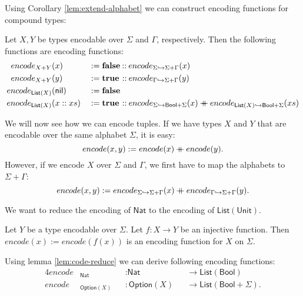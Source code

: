 \documentclass{psartcl}
\newcommand{\MS}[1]{\textsf{#1}}
\newcommand{\nil}{\MS{nil}}
\newcommand{\cons}{\mathbin{::}}
\newcommand\mdoubleplus{\ensuremath{\mathbin{+\mkern-10mu+}}}
\newcommand{\app}{\mdoubleplus}
\newcommand{\from}{:}
\renewcommand{\to}{\rightarrow}
\newcommand{\Option}{\MS{Option}}
\newcommand{\Bool}{\MS{Bool}}
\newcommand{\Nat}{\MS{Nat}}
\newcommand{\Unit}{\MS{Unit}}
\newcommand{\List}{\MS{List}}
\newcommand{\true}{\mathbf{true}}
\newcommand{\false}{\mathbf{false}}
\newcommand{\Tau}{\Gamma}
\begin{document}
Using Corollary \ref{lem:extend-alphabet} we can construct encoding functions for compound types:
\begin{corollary}
  \label{lem:code-compound}
  Let $X, Y$ be types encodable over $\Sigma$ and $\Tau$, respectively.
  Then the following functions are encoding functions:
  \begin{alignat*}{2}
    encode_{X+Y}&(x)             &&:= \false                 \cons encode_{\Sigma \hookrightarrow \Sigma + \Tau}(x) \\
    encode_{X+Y}&(y)             &&:= \true \hspace{0.15em} \cons encode_{\Tau   \hookrightarrow \Sigma + \Tau}(y) \\
    encode_{\List(X)}& (\nil)    &&:= \false \\
    enocde_{\List(X)}& (x :: xs) &&:= \true \hspace{0.15em} \cons encode_{\Sigma \hookrightarrow \Bool + \Sigma}(x) \app
                                      encode_{\List(X) \hookrightarrow \Bool + \Sigma}(xs)
  \end{alignat*}
\end{corollary}

We will now see how we can encode tuples.  If we have types $X$ and $Y$ that are encodable over the same alphabet $\Sigma$, it is easy:
$$encode(x,y) := encode(x) \app encode(y).$$
However, if we encode $X$ over $\Sigma$ and $\Tau$, we first have to map the alphabets to $\Sigma + \Tau$:
$$encode(x,y) := encode_{\Sigma \hookrightarrow \Sigma + \Tau}(x) \app encode_{\Tau \hookrightarrow \Sigma + \Tau}(y).$$

We want to reduce the encoding of $\Nat$ to the encoding of $\List(\Unit)$.
\begin{lemma}
  \label{lem:code-reduce}
  Let $Y$ be a type encodable over $\Sigma$.
  Let $f \from X \to Y$ be an injective function.
  Then $encode(x) := encode(f(x))$ is an encoding function for $X$ on $\Sigma$.
\end{lemma}
\begin{corollary}
  Using lemma \ref{lem:code-reduce} we can derive following encoding functions:
  \begin{alignat*}{4}
    encode&_\Nat      &&\from \Nat    &&\to \List(\Bool) \\
    encode&_{\Option(X)} &&\from \Option(X) &&\to \List(\Bool + \Sigma).
  \end{alignat*}
\end{corollary}
\end{document}
